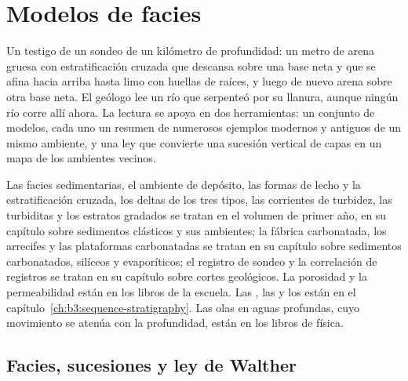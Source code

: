 \chapter{Modelos de facies}\label{ch:b3:facies-models}

Un testigo de un sondeo de un kilómetro de profundidad: un metro de arena gruesa
con estratificación cruzada que descansa sobre una base neta y que se afina hacia
arriba hasta limo con huellas de raíces, y luego de nuevo arena sobre otra base neta.
El geólogo lee un río que serpenteó por su llanura, aunque ningún río corre allí
ahora. La lectura se apoya en dos herramientas: un conjunto de modelos, cada uno
un resumen de numerosos ejemplos modernos y antiguos de un mismo ambiente, y una
ley que convierte una sucesión vertical de capas en un mapa de los ambientes vecinos.

\begin{recall}
Las facies sedimentarias, el ambiente de depósito, las formas de lecho y la
estratificación cruzada, los deltas de los tres tipos, las corrientes de turbidez,
las turbiditas y los estratos gradados se tratan en el volumen de primer año, en su
capítulo sobre sedimentos clásticos y sus ambientes; la fábrica carbonatada, los arrecifes
y las plataformas carbonatadas se tratan en su capítulo sobre sedimentos carbonatados,
silíceos y evaporíticos; el registro de sondeo y la correlación de registros se tratan
en su capítulo sobre cortes geológicos. La porosidad y la permeabilidad están en los
libros de la escuela. Las , las  y los 
están en el capítulo~\ref{ch:b3:sequence-stratigraphy}. Las olas en aguas profundas, cuyo movimiento se atenúa con la profundidad, están en los libros de física.
\end{recall}

\section{Facies, sucesiones y ley de Walther}\label{sec:b3:facies-models:walther}

